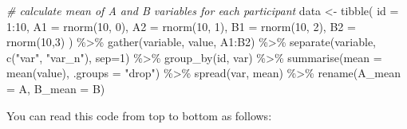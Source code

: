 \documentclass[
  oneside]{book}
\newenvironment{Shaded}{\begin{snugshade}}{\end{snugshade}}
\newcommand{\AttributeTok}[1]{\textcolor[rgb]{0.77,0.63,0.00}{#1}}
\newcommand{\CommentTok}[1]{\textcolor[rgb]{0.56,0.35,0.01}{\textit{#1}}}
\newcommand{\DecValTok}[1]{\textcolor[rgb]{0.00,0.00,0.81}{#1}}
\newcommand{\FunctionTok}[1]{\textcolor[rgb]{0.00,0.00,0.00}{#1}}
\newcommand{\NormalTok}[1]{#1}
\newcommand{\OtherTok}[1]{\textcolor[rgb]{0.56,0.35,0.01}{#1}}
\newcommand{\SpecialCharTok}[1]{\textcolor[rgb]{0.00,0.00,0.00}{#1}}
\newcommand{\StringTok}[1]{\textcolor[rgb]{0.31,0.60,0.02}{#1}}
\begin{document}
\begin{Shaded}
\begin{Highlighting}[]
\CommentTok{\# calculate mean of A and B variables for each participant}
\NormalTok{data }\OtherTok{\textless{}{-}} \FunctionTok{tibble}\NormalTok{(}
  \AttributeTok{id =} \DecValTok{1}\SpecialCharTok{:}\DecValTok{10}\NormalTok{,}
  \AttributeTok{A1 =} \FunctionTok{rnorm}\NormalTok{(}\DecValTok{10}\NormalTok{, }\DecValTok{0}\NormalTok{),}
  \AttributeTok{A2 =} \FunctionTok{rnorm}\NormalTok{(}\DecValTok{10}\NormalTok{, }\DecValTok{1}\NormalTok{),}
  \AttributeTok{B1 =} \FunctionTok{rnorm}\NormalTok{(}\DecValTok{10}\NormalTok{, }\DecValTok{2}\NormalTok{),}
  \AttributeTok{B2 =} \FunctionTok{rnorm}\NormalTok{(}\DecValTok{10}\NormalTok{,}\DecValTok{3}\NormalTok{)}
\NormalTok{) }\SpecialCharTok{\%\textgreater{}\%}
  \FunctionTok{gather}\NormalTok{(variable, value, A1}\SpecialCharTok{:}\NormalTok{B2) }\SpecialCharTok{\%\textgreater{}\%}
  \FunctionTok{separate}\NormalTok{(variable, }\FunctionTok{c}\NormalTok{(}\StringTok{"var"}\NormalTok{, }\StringTok{"var\_n"}\NormalTok{), }\AttributeTok{sep=}\DecValTok{1}\NormalTok{) }\SpecialCharTok{\%\textgreater{}\%}
  \FunctionTok{group\_by}\NormalTok{(id, var) }\SpecialCharTok{\%\textgreater{}\%}
  \FunctionTok{summarise}\NormalTok{(}\AttributeTok{mean =} \FunctionTok{mean}\NormalTok{(value), }\AttributeTok{.groups =} \StringTok{"drop"}\NormalTok{) }\SpecialCharTok{\%\textgreater{}\%}
  \FunctionTok{spread}\NormalTok{(var, mean) }\SpecialCharTok{\%\textgreater{}\%}
  \FunctionTok{rename}\NormalTok{(}\AttributeTok{A\_mean =}\NormalTok{ A, }\AttributeTok{B\_mean =}\NormalTok{ B)}
\end{Highlighting}
\end{Shaded}

You can read this code from top to bottom as follows:
\end{document}

